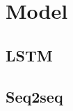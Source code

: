 %
\chapter{Model}
\label{sec:model}

\section{LSTM}
\label{sec:model:LSTM}


\section{Seq2seq}
\label{sec:model:seq2seq}
\Blindtext[2][1]
